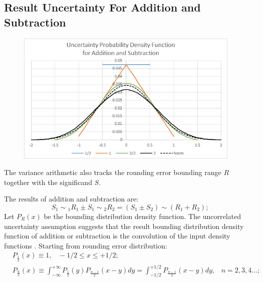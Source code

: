 \documentclass[twoside]{article}
\numberwithin{equation}{section}
\newcommand{\tilt}{\!\!\sim\!\!}
\newcommand{\eqspace}{\;\;\;}
\begin{document}
\subsection{Result Uncertainty For Addition and Subtraction}

\begin{figure}[p]
\centering
\includegraphics[height=2.5in]{Prec_Add_ErrDist.png} 
\label{fig: Prec_Add_Err_Dist}
\end{figure}

The variance arithmetic also tracks the rounding error bounding range $R$ together with the significand $S$. 

The results of addition and subtraction are:
\begin{equation}
\label{eqn: rounding error +-}
S_1 \tilt_1 R_1 \pm S_1 \tilt_2 R_2 = (S_{1} \pm S_{2}) \tilt (R_1 + R_2);
\end{equation}
Let $P_R(x)$ be the bounding distribution density function.
The uncorrelated uncertainty assumption suggests that the result bounding distribution density function of addition or subtraction is the convolution of the input density functions \cite{Probability_Statistics}.  
Starting from rounding error distribution:
\begin{align}
\label{eqn: rounding error 1/2 distribution}
& P_{\frac{1}{2}}(x) \equiv 1, \eqspace  -1/2 \leq x \leq +1/2;  \\
\label{eqn:rounding error n/2 distribution}
& P_{\frac{n}{2}}(x) \equiv \int _{-\infty}^{+\infty}P_{\frac{1}{2}}(y)P_{\frac{n-1}{2}}(x-y)dy=\int _{-1/2}^{+1/2}P_{\frac{n-1}{2}}(x-y) dy,\eqspace n=2,3,4\dots;
\end{align}
\end{document}
